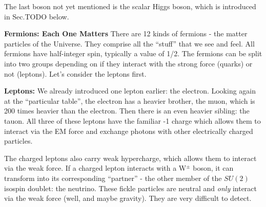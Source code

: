 The last boson not yet mentioned is the scalar Higgs boson, which is introduced in Sec.TODO below.


\textbf{Fermions: Each One Matters}
There are 12 kinds of fermions - the matter particles of the Universe. 
They comprise all the ``stuff'' that we see and feel.
All fermions have half-integer spin, typically a value of 1/2. 
The fermions can be split into two groups depending on if they interact with the strong force (quarks) or not (leptons).
Let's consider the leptons first.

{\bf Leptons:}
We already introduced one lepton earlier: the electron. 
Looking again at the ``particular table'', the electron has a heavier brother, the muon, which is 200 times heavier than the electron. 
Then there is an even heavier sibling: the tauon. 
All three of these leptons have the familiar -1 charge which allows them to interact via the EM force and exchange photons with other electrically charged particles.

The charged leptons also carry weak hypercharge, which allows them to interact via the weak force. 
If a charged lepton interacts with a W$^\pm$ boson, it can transform into its corresponding ``partner'' - the other member of the $SU(2)$ isospin doublet: the neutrino.
These fickle particles are neutral and \emph{only} interact via the weak force (well, and maybe gravity). 
They are very difficult to detect.



